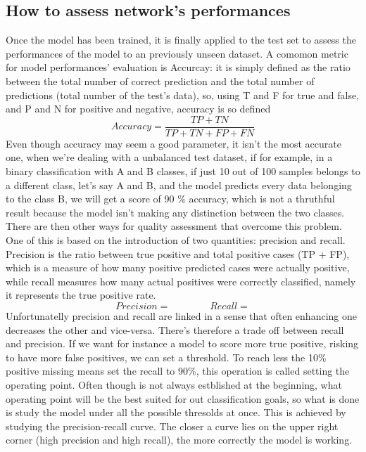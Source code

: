 \documentclass[a4paper,11pt]{article}
\begin{document}
\subsection{How to assess network's performances}
Once the model has been trained, it is finally applied to the test set to assess the performances of the model to an previously unseen dataset.
A comomon metric for model performances' evaluation is Accurcay: it is simply defined as the ratio between the total number of correct prediction and the total number of predictions (total number of the test's data), so, using T and F for true and false, and P and N for positive and negative, accuracy is so defined
\begin{equation}
Accuracy = \frac{TP + TN}{TP+TN+FP+FN}
\end{equation}
Even though accuracy may seem a good parameter, it isn't the most accurate one, when we're dealing with a unbalanced test dataset, if for example, in a binary classification with A and B classes, if just 10 out of 100 samples belongs to a different class, let's say A and B, and the model predicts every data belonging to the class B, we will get a score of 90 \% accuracy, which is not a thruthful result because the model isn't making any distinction between the two classes.
There are then other ways for quality assessment that overcome this problem. One of this is based on the introduction of two quantities: precision and recall.
Precision is the ratio between true positive and total positive cases (TP + FP), which is a measure of how many positive predicted cases were actually positive, while recall measures how many actual positives were correctly classified, namely it represents the true positive rate.
\begin{equation}
Precision = \qquad \qquad Recall =
\end{equation}
Unfortunatelly precision and recall are linked in a sense that often enhancing one decreases the other and vice-versa.
There's therefore a trade off between recall and precision. If we want for instance a model to score more true positive, risking to have more false positives, we can set a threshold.
To reach less the 10\% positive missing means set the recall to 90\%, this operation is called setting the operating point.
Often though is not always estblished at the beginning, what operating point will be the best suited for out classification goals, so what is done is study the model under all the possible thresolds at once.
This is achieved by studying the precision-recall curve. The closer a curve lies on the upper right corner (high precision and high recall), the more correctly the model is working.
\end{document}
